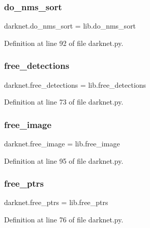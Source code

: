 \subsubsection{\texorpdfstring{do\_nms\_sort}{do\_nms\_sort}}
{\footnotesize\ttfamily darknet.\+do\+\_\+nms\+\_\+sort = lib.\+do\+\_\+nms\+\_\+sort}



Definition at line 92 of file darknet.\+py.

\mbox{\label{namespacedarknet_a930fc8c0ad24a45678775b4bcb2d744e}} 
\subsubsection{\texorpdfstring{free\_detections}{free\_detections}}
{\footnotesize\ttfamily darknet.\+free\+\_\+detections = lib.\+free\+\_\+detections}



Definition at line 73 of file darknet.\+py.

\mbox{\label{namespacedarknet_a8eecbd375bf2071e9b556831ed48f2f7}} 
\subsubsection{\texorpdfstring{free\_image}{free\_image}}
{\footnotesize\ttfamily darknet.\+free\+\_\+image = lib.\+free\+\_\+image}



Definition at line 95 of file darknet.\+py.

\mbox{\label{namespacedarknet_a0b1357754b88c0ec40003d81b94b642a}} 
\subsubsection{\texorpdfstring{free\_ptrs}{free\_ptrs}}
{\footnotesize\ttfamily darknet.\+free\+\_\+ptrs = lib.\+free\+\_\+ptrs}



Definition at line 76 of file darknet.\+py.

\mbox{\label{namespacedarknet_ab7f7896dc9f1e9ed6dcb44af8e2ce453}} 
